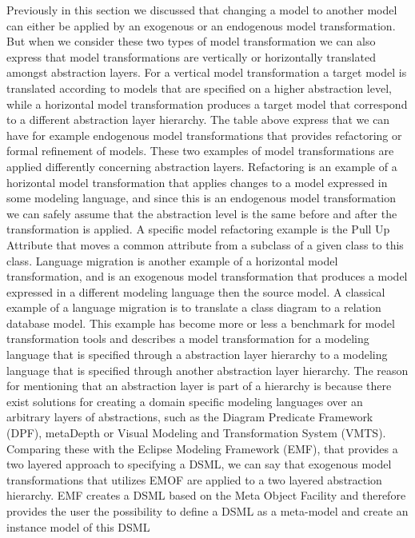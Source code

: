 Previously in this section we discussed that changing a model to another model 
can either be applied by an exogenous or an endogenous model transformation.
But when we consider these two types of model transformation we can also express
that model transformations are vertically or horizontally translated amongst
abstraction layers. For a vertical model transformation a target model is
translated according to models that are specified on a higher abstraction level,
while a horizontal model transformation produces a target model that correspond
to a different abstraction layer hierarchy. The table above express that we can have
for example endogenous model transformations that provides refactoring or
formal refinement of models. These two examples of model transformations are
applied differently concerning abstraction layers. Refactoring is an example of a
horizontal model transformation that applies changes to a model expressed in
some modeling language, and since this is an endogenous model transformation we
can safely assume that the abstraction level is the same before and after the
transformation is applied. A specific model refactoring example is the Pull Up
Attribute\cite{Henshin_2010} that moves a common attribute from a subclass of a
given class to this class. Language migration is another example of a horizontal
model transformation, and is an exogenous model transformation that produces a
model expressed in a different modeling language then the source model.
A classical example of a language migration is to translate a class diagram to a
relation database model. This example has become more or less a benchmark for
model transformation tools and describes a model transformation for a modeling
language that is specified through a abstraction layer hierarchy to a modeling language
that is specified through another abstraction layer hierarchy. The reason for
mentioning that an abstraction layer is part of a hierarchy is because there
exist solutions for creating a domain specific modeling languages over an
arbitrary layers of abstractions, such as the Diagram Predicate
Framework\cite{Lamo2013} (DPF), metaDepth\cite{de2010deep} or Visual Modeling
and Transformation System\cite{levendovszky2005systematic} (VMTS). Comparing
these with the Eclipse Modeling Framework (EMF), that provides a two layered
approach to specifying a DSML, we can say that exogenous model transformations
that utilizes EMOF are applied to a two layered abstraction hierarchy. EMF
creates a DSML based on the Meta Object Facility and therefore provides the user the possibility to
define a DSML as a meta-model and create an instance model of this DSML
